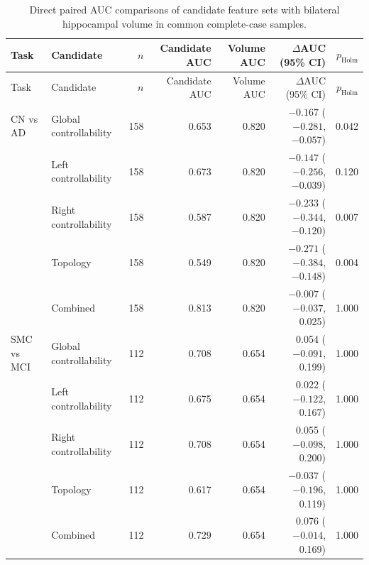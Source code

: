 \documentclass{article}
\providecommand{\DIFaddtex}[1]{{\protect\color{blue}#1}} %
\providecommand{\DIFadd}[1]{\texorpdfstring{\DIFaddtex{#1}}{#1}} %
\begin{document}
\begin{landscape}
\begin{longtable}{llrrrrr}
\caption{\DIFadd{Direct paired AUC comparisons of candidate feature sets with bilateral hippocampal volume in common complete-case samples.}}\label{tab:paired_volume_classification}\\
\toprule
\DIFadd{Task }& \DIFadd{Candidate }& \DIFadd{$n$ }& \DIFadd{Candidate AUC }& \DIFadd{Volume AUC }& \DIFadd{$\Delta$AUC (95\% CI) }& \DIFadd{$p_{\mathrm{Holm}}$}\\
\midrule
\endfirsthead
\toprule \DIFadd{Task }& \DIFadd{Candidate }& \DIFadd{$n$ }& \DIFadd{Candidate AUC }& \DIFadd{Volume AUC }& \DIFadd{$\Delta$AUC (95\% CI) }& \DIFadd{$p_{\mathrm{Holm}}$}\\ \midrule
\endhead
\DIFadd{CN vs AD }& \DIFadd{Global controllability }& \DIFadd{158 }& \DIFadd{0.653 }& \DIFadd{0.820 }& \DIFadd{$-0.167$ ($-0.281$, $-0.057$) }& \DIFadd{0.042}\\
& \DIFadd{Left controllability }& \DIFadd{158 }& \DIFadd{0.673 }& \DIFadd{0.820 }& \DIFadd{$-0.147$ ($-0.256$, $-0.039$) }& \DIFadd{0.120}\\
& \DIFadd{Right controllability }& \DIFadd{158 }& \DIFadd{0.587 }& \DIFadd{0.820 }& \DIFadd{$-0.233$ ($-0.344$, $-0.120$) }& \DIFadd{0.007}\\
& \DIFadd{Topology }& \DIFadd{158 }& \DIFadd{0.549 }& \DIFadd{0.820 }& \DIFadd{$-0.271$ ($-0.384$, $-0.148$) }& \DIFadd{0.004}\\
& \DIFadd{Combined }& \DIFadd{158 }& \DIFadd{0.813 }& \DIFadd{0.820 }& \DIFadd{$-0.007$ ($-0.037$, 0.025) }& \DIFadd{1.000}\\
\addlinespace
\DIFadd{SMC vs MCI }& \DIFadd{Global controllability }& \DIFadd{112 }& \DIFadd{0.708 }& \DIFadd{0.654 }& \DIFadd{0.054 ($-0.091$, 0.199) }& \DIFadd{1.000}\\
& \DIFadd{Left controllability }& \DIFadd{112 }& \DIFadd{0.675 }& \DIFadd{0.654 }& \DIFadd{0.022 ($-0.122$, 0.167) }& \DIFadd{1.000}\\
& \DIFadd{Right controllability }& \DIFadd{112 }& \DIFadd{0.708 }& \DIFadd{0.654 }& \DIFadd{0.055 ($-0.098$, 0.200) }& \DIFadd{1.000}\\
& \DIFadd{Topology }& \DIFadd{112 }& \DIFadd{0.617 }& \DIFadd{0.654 }& \DIFadd{$-0.037$ ($-0.196$, 0.119) }& \DIFadd{1.000}\\
& \DIFadd{Combined }& \DIFadd{112 }& \DIFadd{0.729 }& \DIFadd{0.654 }& \DIFadd{0.076 ($-0.014$, 0.169) }& \DIFadd{1.000}\\

\end{longtable}
\end{landscape}
\end{document}
